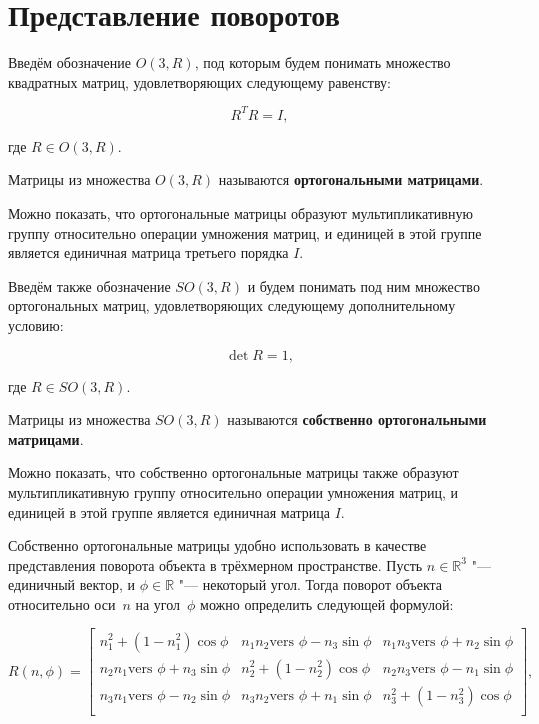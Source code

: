 \section{Представление поворотов}

Введём обозначение $O(3,R)$, под которым будем понимать множество квадратных матриц, удовлетворяющих следующему
равенству:

$$R^T R=I,$$

\noindent где $R \in O(3,R)$.

\begin{definition}
Матрицы из множества $O(3,R)$ называются \textbf{ортогональными матрицами}.
\end{definition}

Можно показать, что ортогональные матрицы образуют мультипликативную группу относительно операции умножения матриц, и
единицей в этой группе является единичная матрица третьего порядка $I$.

Введём также обозначение $SO(3,R)$ и будем понимать под ним множество ортогональных матриц, удовлетворяющих
следующему дополнительному условию:

$$\det R = 1,$$

\noindent где $R \in SO(3, R)$.

\begin{definition}
Матрицы из множества $SO(3,R)$ называются \textbf{собственно ортогональными матрицами}.
\end{definition}

Можно показать, что собственно ортогональные матрицы также образуют мультипликативную группу относительно операции
умножения матриц, и единицей в этой группе является единичная матрица $I$.

Собственно ортогональные матрицы удобно использовать в качестве представления поворота объекта в трёхмерном
пространстве. Пусть $n \in \mathbb{R}^3$ "--- единичный вектор, и $\phi \in \mathbb{R}$ "--- некоторый угол. Тогда
поворот объекта относительно оси~$n$ на угол~$\phi$ можно определить следующей формулой:

$$
R(n,\phi)=
\left[ {\begin{array}{ccc}
    n_1^2+(1-n_1^2)\cos \phi                 & n_1 n_2\textrm{vers } \phi-n_3 \sin \phi & n_1 n_3\textrm{vers } \phi+n_2 \sin \phi \\
    n_2 n_1\textrm{vers } \phi+n_3 \sin \phi & n_2^2+(1-n_2^2)\cos \phi                 & n_2 n_3\textrm{vers } \phi-n_1 \sin \phi \\
    n_3 n_1\textrm{vers } \phi-n_2 \sin \phi & n_3 n_2\textrm{vers } \phi+n_1 \sin \phi & n_3^2+(1-n_3^2)\cos \phi                 \\
\end{array} } \right],
$$

